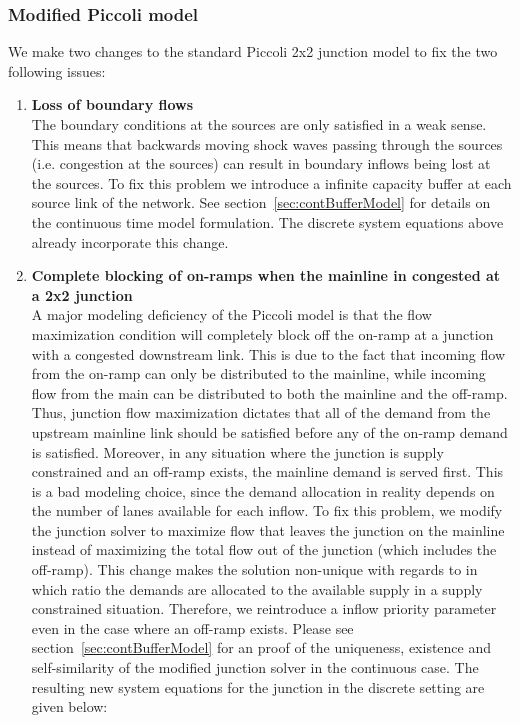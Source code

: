 \subsubsection{Modified Piccoli model}
\label{sec:newModel}
We make two changes to the standard Piccoli 2x2 junction model to fix the two following issues:
\begin{enumerate}
\item \textbf{Loss of boundary flows}\\
The boundary conditions at the sources are only satisfied in a weak sense. This means that backwards moving shock waves passing through the sources (i.e. congestion at the sources) can result in boundary inflows being lost at the sources. To fix this problem we introduce a infinite capacity buffer at each source link of the network. See section~\ref{sec:contBufferModel} for details on the continuous time model formulation. The discrete system equations above already incorporate this change.
\item \textbf{Complete blocking of on-ramps when the mainline in congested at a 2x2 junction}\\
A major modeling deficiency of the Piccoli model is that the flow maximization condition will completely block off the on-ramp at a junction with a congested downstream link. This is due to the fact that incoming flow from the on-ramp can only be distributed to the mainline, while incoming flow from the main can be distributed to both the mainline and the off-ramp. Thus, junction flow maximization dictates that all of the demand from the upstream mainline link should be satisfied before any of the on-ramp demand is satisfied. Moreover, in any situation where the junction is supply constrained and an off-ramp exists, the mainline demand is served first. This is a bad modeling choice, since the demand allocation in reality depends on the number of lanes available for each inflow. 
To fix this problem, we modify the junction solver to maximize flow that leaves the junction on the mainline instead of maximizing the total flow out of the junction (which includes the off-ramp). This change makes the solution non-unique with regards to in which ratio the demands are allocated to the available supply in a supply constrained situation. Therefore, we reintroduce a inflow priority parameter even in the case where an off-ramp exists. Please see section~\ref{sec:contBufferModel} for an proof of the uniqueness, existence and self-similarity of the modified junction solver in the continuous case. The resulting new system equations for the junction in the discrete setting are given below: 
\end{enumerate}


